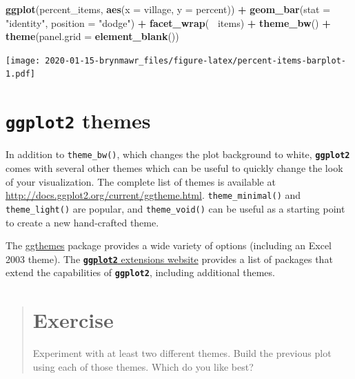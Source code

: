\documentclass[]{book}
\newenvironment{Shaded}{\begin{snugshade}}{\end{snugshade}}
\newcommand{\KeywordTok}[1]{\textcolor[rgb]{0.13,0.29,0.53}{\textbf{#1}}}
\newcommand{\DataTypeTok}[1]{\textcolor[rgb]{0.13,0.29,0.53}{#1}}
\newcommand{\StringTok}[1]{\textcolor[rgb]{0.31,0.60,0.02}{#1}}
\newcommand{\OperatorTok}[1]{\textcolor[rgb]{0.81,0.36,0.00}{\textbf{#1}}}
\newcommand{\NormalTok}[1]{#1}
\begin{document}
\begin{Shaded}
\begin{Highlighting}[]
\KeywordTok{ggplot}\NormalTok{(percent_items, }\KeywordTok{aes}\NormalTok{(}\DataTypeTok{x =}\NormalTok{ village, }\DataTypeTok{y =}\NormalTok{ percent)) }\OperatorTok{+}
\StringTok{    }\KeywordTok{geom_bar}\NormalTok{(}\DataTypeTok{stat =} \StringTok{"identity"}\NormalTok{, }\DataTypeTok{position =} \StringTok{"dodge"}\NormalTok{) }\OperatorTok{+}
\StringTok{    }\KeywordTok{facet_wrap}\NormalTok{(}\OperatorTok{~}\StringTok{ }\NormalTok{items) }\OperatorTok{+}
\StringTok{    }\KeywordTok{theme_bw}\NormalTok{() }\OperatorTok{+}
\StringTok{    }\KeywordTok{theme}\NormalTok{(}\DataTypeTok{panel.grid =} \KeywordTok{element_blank}\NormalTok{())}
\end{Highlighting}
\end{Shaded}

\texttt{[image: 2020-01-15-brynmawr\_files/figure-latex/percent-items-barplot-1.pdf]}

\section{\texorpdfstring{\textbf{\texttt{ggplot2}}
themes}{ggplot2 themes}}\label{ggplot2-themes}

In addition to \texttt{theme\_bw()}, which changes the plot background
to white, \textbf{\texttt{ggplot2}} comes with several other themes
which can be useful to quickly change the look of your visualization.
The complete list of themes is available at
\url{http://docs.ggplot2.org/current/ggtheme.html}.
\texttt{theme\_minimal()} and \texttt{theme\_light()} are popular, and
\texttt{theme\_void()} can be useful as a starting point to create a new
hand-crafted theme.

The
\href{https://jrnold.github.io/ggthemes/reference/index.html}{ggthemes}
package provides a wide variety of options (including an Excel 2003
theme). The
\href{https://www.ggplot2-exts.org}{\textbf{\texttt{ggplot2}} extensions
website} provides a list of packages that extend the capabilities of
\textbf{\texttt{ggplot2}}, including additional themes.

\begin{quote}
\section{Exercise}\label{exercise-14}

Experiment with at least two different themes. Build the previous plot
using each of those themes. Which do you like best?
\end{quote}
\end{document}
